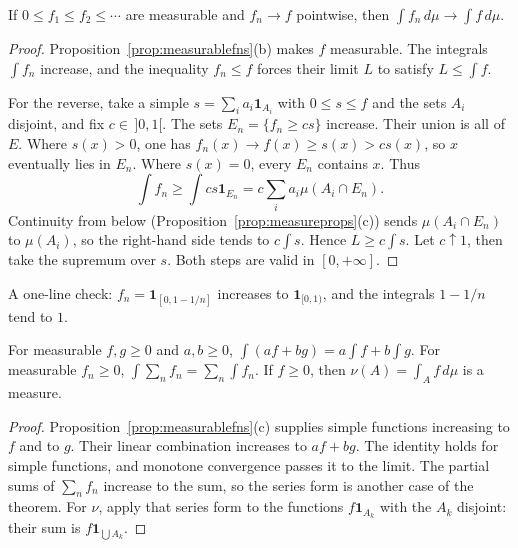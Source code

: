 \begin{theorem}\label{thm:mct6}
If \(0\le f_1\le f_2\le\cdots\) are measurable and \(f_n\to f\) pointwise, then \(\int f_n\,d\mu\to\int f\,d\mu\).
\end{theorem}
\begin{proof}
Proposition~\ref{prop:measurablefns}(b) makes \(f\) measurable. The integrals \(\int f_n\) increase, and the inequality \(f_n\le f\) forces their limit \(L\) to satisfy \(L\le\int f\).

For the reverse, take a simple \(s=\sum_ia_i\mathbf 1_{A_i}\) with \(0\le s\le f\) and the sets \(A_i\) disjoint, and fix \(c\in\,]0,1[\). The sets \(E_n=\{f_n\ge cs\}\) increase. Their union is all of \(E\). Where \(s(x)>0\), one has \(f_n(x)\to f(x)\ge s(x)>cs(x)\), so \(x\) eventually lies in \(E_n\). Where \(s(x)=0\), every \(E_n\) contains \(x\). Thus
\[
\int f_n\ge\int cs\mathbf 1_{E_n}=c\sum_ia_i\mu(A_i\cap E_n).
\]
Continuity from below (Proposition~\ref{prop:measureprops}(c)) sends \(\mu(A_i\cap E_n)\) to \(\mu(A_i)\), so the right-hand side tends to \(c\int s\). Hence \(L\ge c\int s\). Let \(c\uparrow1\), then take the supremum over \(s\). Both steps are valid in \([0,+\infty]\).
\end{proof}

A one-line check: \(f_n=\mathbf 1_{[0,1-1/n]}\) increases to \(\mathbf 1_{[0,1)}\), and the integrals \(1-1/n\) tend to \(1\).

\begin{corollary}\label{cor:linearity6}
For measurable \(f,g\ge0\) and \(a,b\ge0\), \(\int(af+bg)=a\int f+b\int g\). For measurable \(f_n\ge0\), \(\int\sum_nf_n=\sum_n\int f_n\). If \(f\ge0\), then \(\nu(A)=\int_Af\,d\mu\) is a measure.
\end{corollary}
\begin{proof}
Proposition~\ref{prop:measurablefns}(c) supplies simple functions increasing to \(f\) and to \(g\). Their linear combination increases to \(af+bg\). The identity holds for simple functions, and monotone convergence passes it to the limit. The partial sums of \(\sum_nf_n\) increase to the sum, so the series form is another case of the theorem. For \(\nu\), apply that series form to the functions \(f\mathbf 1_{A_k}\) with the \(A_k\) disjoint: their sum is \(f\mathbf 1_{\bigcup A_k}\).
\end{proof}

